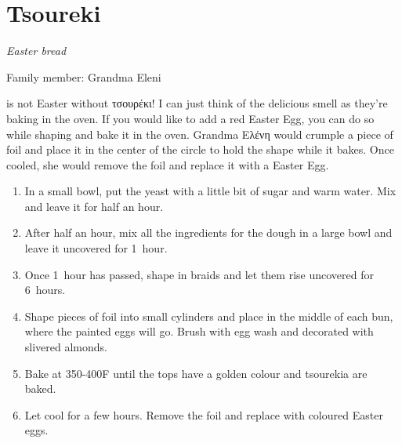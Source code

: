 \chapter{Tsoureki}
\label{ch:tsoureki}


\textit{Easter bread}

Family member: Grandma Eleni

 is not Easter without \textgreek{τσουρέκι}! I can just think of the delicious smell as they're baking in the oven. If you would like to add a red Easter Egg, you can do so while shaping and bake it in the oven. Grandma \textgreek{Ελένη} would crumple a piece of foil and place it in the center of the circle to hold the shape while it bakes. Once cooled, she would remove the foil and replace it with a Easter Egg.

\begin{enumerate}
    \item In a small bowl, put the yeast with a little bit of sugar and warm water. Mix and leave it for half an hour.
    \item After half an hour, mix all the ingredients for the dough in a large bowl and leave it uncovered for 1~hour.
    \item Once 1~hour has passed, shape in braids and let them rise uncovered for 6~hours.
    \item Shape pieces of foil into small cylinders and place in the middle of each bun, where the painted eggs will go. Brush with egg wash and decorated with slivered almonds.
    \item Bake at 350-400\degree F until the tops have a golden colour and tsourekia are baked.
    \item Let cool for a few hours. Remove the foil and replace with coloured Easter eggs.
\end{enumerate}


